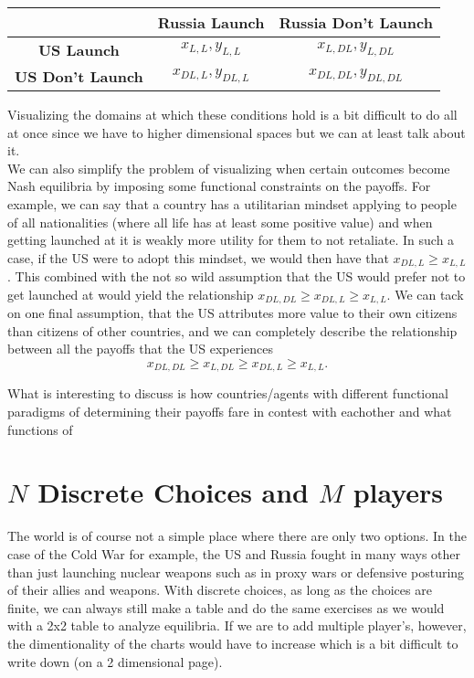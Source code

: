 \documentclass[11pt,english]{article}
\begin{document}
\begin{center}
\begin{tabular}{ c |c |c| }
  & \textbf{Russia Launch} & \textbf{Russia Don't Launch}\\
\hline 
\textbf{US Launch} & $x_{L,L}, y_{L,L}$ & $x_{L,DL}, y_{L,DL}$  \\
\hline  
\textbf{US Don't Launch} & $x_{DL,L}, y_{DL,L}$ & $x_{DL,DL}, y_{DL,DL}$ \\
\hline
\end{tabular}
\end{center}

\noindent Visualizing the domains at which these conditions hold is a bit difficult to do all at once since we have to higher dimensional spaces but we can at least talk about it.\\

\noindent We can also simplify the problem of visualizing when certain outcomes become Nash equilibria by imposing some functional constraints on the payoffs. For example, we can say that a country has a utilitarian mindset applying to people of all nationalities (where all life has at least some positive value) and when getting launched at it is weakly more utility for them to not retaliate. In such a case, if the US were to adopt this mindset, we would then have that $x_{DL,L} \geq x_{L,L}$. This combined with the not so wild assumption that the US would prefer not to get launched at would yield the relationship $x_{DL,DL} \geq x_{DL,L} \geq x_{L,L}$. We can tack on one final assumption, that the US attributes more value to their own citizens than citizens of other countries, and we can completely describe the relationship between all the payoffs that the US experiences $$x_{DL,DL} \geq x_{L,DL} \geq x_{DL,L} \geq x_{L,L}.$$

\noindent What is interesting to discuss is how countries/agents with different functional paradigms of determining their payoffs fare in contest with eachother and what functions of 

\section*{$N$ Discrete Choices and $M$ players}

The world is of course not a simple place where there are only two options. In the case of the Cold War for example, the US and Russia fought in many ways other than just launching nuclear weapons such as in proxy wars or defensive posturing of their allies and weapons. With discrete choices, as long as the choices are finite, we can always still make a table and do the same exercises as we would with a 2x2 table to analyze equilibria. If we are to add multiple player's, however, the dimentionality of the charts would have to increase which is a bit difficult to write down (on a 2 dimensional page). \\
\end{document}

